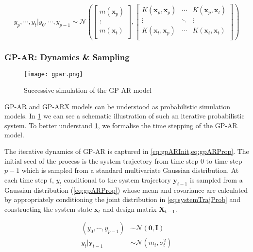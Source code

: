 \begin{equation}\label{eq:systemTrajProb}
    y_{p}, \cdots, y_{t} \rvert y_{0}, \cdots, y_{p-1} \sim \mathcal{N}
    \left( 
        \begin{bmatrix}
            m(\mathbf{x}_{p})\\ 
            \vdots\\ 
            m(\mathbf{x}_{t})\\ 
        \end{bmatrix},
        \begin{bmatrix}
          K(\mathbf{x}_p, \mathbf{x}_p) & \cdots & K(\mathbf{x}_p, \mathbf{x}_t) \\
          \vdots & \ddots & \vdots \\
          K(\mathbf{x}_t, \mathbf{x}_p) & \cdots & K(\mathbf{x}_t, \mathbf{x}_t)\\
        \end{bmatrix}  
    \right) 
\end{equation}


\subsubsection*{GP-AR: Dynamics \& Sampling}

\begin{figure}[ht]
    \centering
    \noindent\texttt{[image: gpar.png]}
    \caption{Successive simulation of the GP-AR model}
    \label{fig:gparDiag}
\end{figure}


GP-AR and GP-ARX models can be understood as probabilistic simulation models. In \cref{fig:gparDiag} we can 
see a schematic illustration of such an iterative probabilistic system. To better understand \cref{fig:gparDiag}, 
we formalise the time stepping of the GP-AR model.

The iterative dynamics of GP-AR is captured in \cref{eq:gpARInit,eq:gpARProp}. The initial seed of the process is the 
system trajectory from time step $0$ to time step $p-1$ which is sampled from a standard multivariate Gaussian distribution. At each time step $t$, $y_t$ conditional to the system trajectory $\mathbf{y}_{t-1}$ is sampled 
from a Gaussian distribution (\cref{eq:gpARProp}) whose mean and covariance are calculated by appropriately 
conditioning the joint distribution in \cref{eq:systemTrajProb} and constructing the system state 
$\mathbf{x}_t$ and design matrix $\mathbf{X}_{t-1}$.     

\begin{align}
    (y_0, \cdots, y_{p-1}) &\sim \mathcal{N}(\mathbf{0}, \mathbf{I}) \label{eq:gpARInit}\\
    y_t \rvert \mathbf{y}_{t-1} &\sim \mathcal{N}(\bar{m}_t, \bar{\sigma}_{t}^2) \label{eq:gpARProp}
\end{align}

